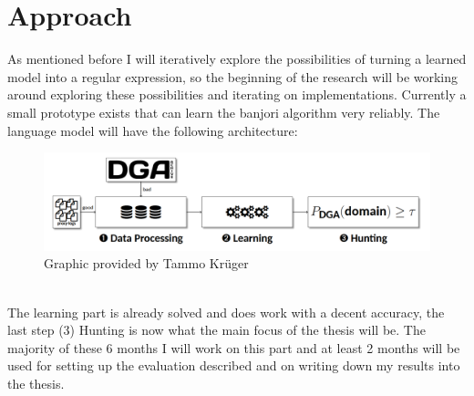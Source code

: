 \documentclass[a4paper, 12pt]{article}
\begin{document}
\section{Approach}
As mentioned before I will iteratively explore the possibilities of turning a learned model into a
regular expression, so the beginning of the research will be working around exploring these
possibilities and iterating on implementations. Currently a small prototype exists that can learn
the banjori algorithm very reliably. 
The language model will have the following architecture:\\
\begin{figure}[h]
    \includegraphics[width=\textwidth]{images/DGA_Detect_Architecture.png}
    \caption{Graphic provided by Tammo Kr\"uger}
\end{figure}\\
The learning part is already solved and does work with a decent accuracy, the last step (3) Hunting
is now what the main focus of the thesis will be. The majority of these 6 months I will work on this
part and at least 2 months will be used for setting up the evaluation described and on writing down
my results into the thesis.
\end{document}
